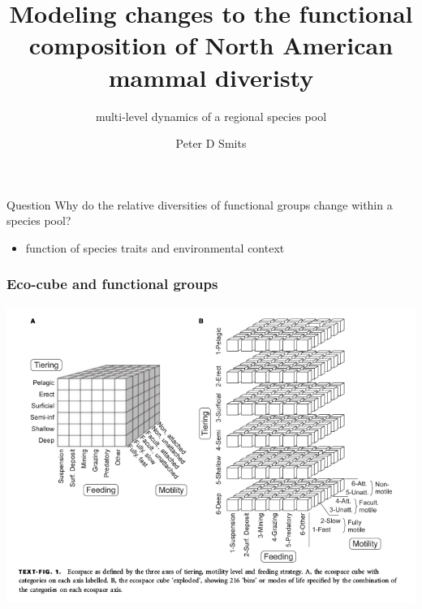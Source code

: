 \documentclass[aspectratio=169]{beamer}
\title{Modeling changes to the functional composition of North American mammal diveristy}
\subtitle{multi-level dynamics of a regional species pool}
\author{Peter D Smits}
\institute{Department of Integrative Biology, University of California -- Berkeley}
\date{}
\begin{document}
\begin{frame}
  \maketitle
\end{frame}


\begin{frame}
  \begin{alertblock}{Question}
    \alert{Why} do the relative diversities of functional groups change within a species pool?
    \begin{itemize}
      \item function of \alert{species traits} and \alert{environmental context}
    \end{itemize}
  \end{alertblock}
\end{frame}

\begin{frame}
  \frametitle{Eco-cube and functional groups}

  \begin{center}
    \includegraphics[height=0.775\textheight,width=\textwidth,keepaspectratio=true]{figure/ecocube}
  \end{center}

  \tiny{}
\end{frame}
\end{document}
